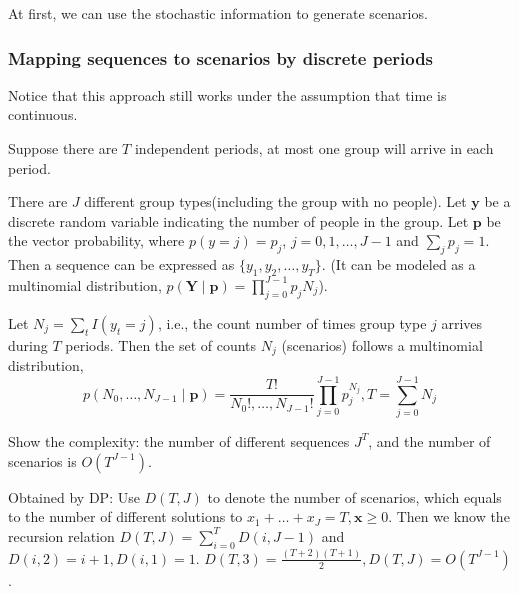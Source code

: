 At first, we can use the stochastic information to generate scenarios.




\subsubsection{Mapping sequences to scenarios by discrete periods}

Notice that this approach still works under the assumption that time is continuous.

Suppose there are $T$ independent periods, at most one group will arrive in each period.

There are $J$ different group types(including the group with no people). Let $\mathbf{y}$ be a discrete random variable indicating the number of people in the group. Let $\mathbf{p}$ be the vector probability, where $p(y = j) = p_j$, $j = 0,1,\ldots,J-1$ and $\sum_{j} p_{j} =1$. Then a sequence can be expressed as $\{y_{1}, y_{2}, \ldots, y_{T}\}$. (It can be modeled as a multinomial distribution, $p(\mathbf{Y} \mid \mathbf{p})=\prod_{j=0}^{J-1} p_j N_j$).

Let $N_{j} = \sum_{t} I(y_t = j)$, i.e., the count number of times group type $j$ arrives during $T$ periods. Then the set of counts $N_{j}$ (scenarios) follows a multinomial distribution, $$p\left(N_0, \ldots, N_{J-1} \mid \mathbf{p}\right)=\frac{T !}{N_{0}!, \ldots, N_{J-1}!} \prod_{j=0}^{J-1} p_{j}^{N_j}, T = \sum_{j=0}^{J-1} N_{j}$$



Show the complexity: the number of different sequences $J^{T}$, and the number of scenarios is $O(T^{J-1})$.

Obtained by DP:
Use $D(T,J) $ to denote the number of scenarios, which equals to the number of different solutions to $x_{1}+\ldots + x_{J} = T, \mathbf{x} \geq 0$.
Then we know the recursion relation $D(T, J) = \sum_{i= 0}^{T} D(i, J-1)$ and $D(i,2) = i+1, D(i,1) = 1$.
$D(T,3) = \frac{(T+2)(T+1)}{2}, D(T,J) = O(T^{J-1})$.

